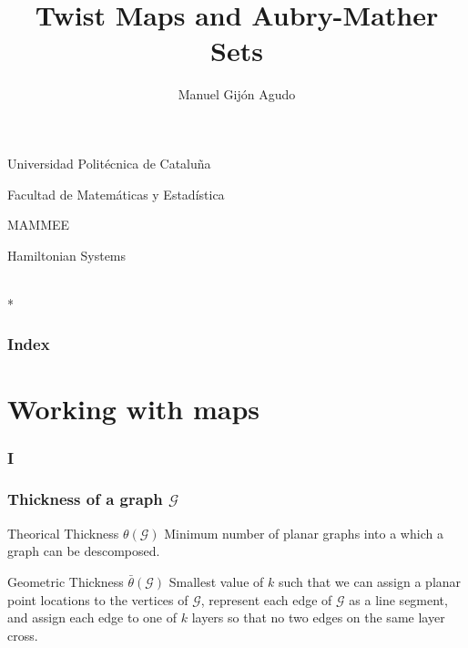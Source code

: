 \documentclass[12 pt]{beamer}
\title{Twist Maps and Aubry-Mather Sets}
\author{\normalsize{Manuel Gijón Agudo}}
\date{}
\begin{document}
\begin{frame}[plain]
    \begin{center}

        Universidad Politécnica de Cataluña
        
        Facultad de Matemáticas y Estadística
        
        MAMMEE
        
        \scriptsize{Hamiltonian Systems}
        
        \maketitle    
        \\*
        
        \small{}
    \end{center}
    
    
\end{frame}



\begin{frame}{0}
    \frametitle{Index}
     
    \tableofcontents  
\end{frame}



\section{Working with maps}

\begin{frame}{1}
    \frametitle{}
    
    
\end{frame}

\begin{frame}{2}
    \frametitle{I}
   
\end{frame}

\begin{frame}{3}
    \frametitle{Thickness of a graph $\mathcal{G}$}
  
    \begin{block}{Theorical Thickness $\theta (\mathcal{G})$}
    Minimum number of planar graphs into a which a graph can be descomposed.
    \end{block}
    
    \pause
    
    \begin{block}{Geometric Thickness $\bar{\theta} (\mathcal{G})$}
    Smallest value of $k$ such that we can assign a planar point locations to the vertices of $\mathcal{G}$, represent each edge of $\mathcal{G}$ as a line segment, and assign each edge to one of $k$ layers so that no two edges on the same layer cross.
    \end{block}

\end{frame}
\end{document}
